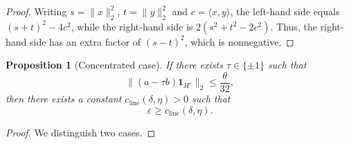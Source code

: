 \documentclass[11pt]{amsart}
\numberwithin{equation}{section}
\newtheorem{proposition}[theorem]{Proposition}
\theoremstyle{definition}
\theoremstyle{remark}
\newcommand{\eps}{\varepsilon}
\newcommand{\norm}[1]{\lVert #1 \rVert}
\newcommand{\ip}[2]{\langle #1,#2\rangle}
\begin{document}
\begin{proof}
Writing $s=\norm{x}_2^2$, $t=\norm{y}_2^2$ and $c=\ip{x}{y}$, the left-hand
side equals $(s+t)^2-4c^2$, while the right-hand side is
$2(s^2+t^2-2c^2)$.  Thus, the right-hand side has an extra factor of $(s-t)^2$, which is nonnegative.
\end{proof}


\begin{proposition}[Concentrated case]\label{prop:concentrated}
If there exists $\tau\in\{\pm 1\}$ such that
\[
\norm{(a-\tau b)\mathbf 1_{H^c}}_2\le \frac{\theta}{32},
\]
then there exists a constant $c_{\mathrm{line}}(\delta,\eta)>0$ such that
\[
\eps\ge c_{\mathrm{line}}(\delta,\eta).
\]
\end{proposition}

\begin{proof}
We distinguish two cases.
\vspace{0.5em}


\end{proof}
\end{document}
